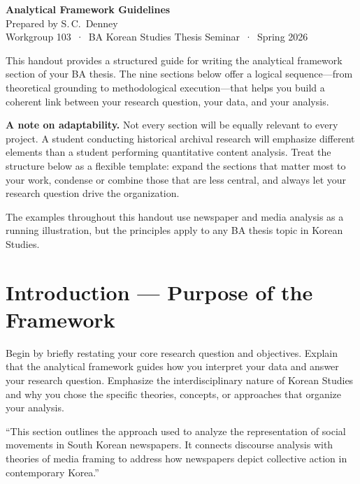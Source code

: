\documentclass[11pt,a4paper]{article}
\begin{document}
\begin{center}
  {\LARGE\bfseries\color{leidenblu} Analytical Framework Guidelines}\\[8pt]
  {\normalsize Prepared by S.\,C.\ Denney}\\[3pt]
  {\small Workgroup 103 \,·\, BA Korean Studies Thesis Seminar \,·\, Spring 2026}
\end{center}

\vspace{0.8em}

\noindent
This handout provides a structured guide for writing the analytical framework section of your BA thesis. The nine sections below offer a logical sequence---from theoretical grounding to methodological execution---that helps you build a coherent link between your research question, your data, and your analysis.

\medskip

\noindent
\textbf{A note on adaptability.} Not every section will be equally relevant to every project. A student conducting historical archival research will emphasize different elements than a student performing quantitative content analysis. Treat the structure below as a flexible template: expand the sections that matter most to your work, condense or combine those that are less central, and always let your research question drive the organization.

\medskip

\noindent
The examples throughout this handout use newspaper and media analysis as a running illustration, but the principles apply to any BA thesis topic in Korean Studies.

\section{Introduction --- Purpose of the Framework}

Begin by briefly restating your core research question and objectives. Explain that the analytical framework guides how you interpret your data and answer your research question. Emphasize the interdisciplinary nature of Korean Studies and why you chose the specific theories, concepts, or approaches that organize your analysis.

\begin{examplebox}
``This section outlines the approach used to analyze the representation of social movements in South Korean newspapers. It connects discourse analysis with theories of media framing to address how newspapers depict collective action in contemporary Korea.''
\end{examplebox}
\end{document}
